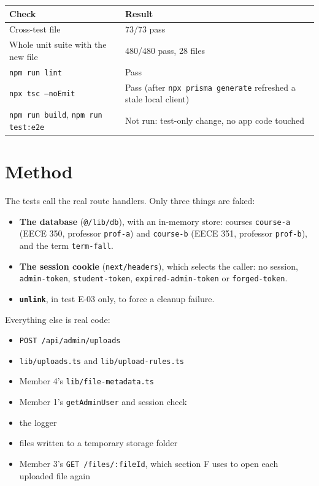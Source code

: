 \documentclass[10pt,a4paper]{article}
\begin{document}
\begin{tabular}{@{}ll@{}}
\toprule \textbf{Check} & \textbf{Result} \\ \midrule
Cross-test file & 73/73 pass \\
Whole unit suite with the new file & 480/480 pass, 28 files \\
\texttt{npm run lint} & Pass \\
\texttt{npx tsc --noEmit} & Pass (after \texttt{npx prisma generate} refreshed a stale local client) \\
\texttt{npm run build}, \texttt{npm run test:e2e} & Not run: test-only change, no app code touched \\
\bottomrule
\end{tabular}

\section*{Method}
The tests call the real route handlers. Only three things are faked:
\begin{itemize}[nosep]
\item \textbf{The database} (\texttt{@/lib/db}), with an in-memory store: courses \texttt{course-a} (EECE 350, professor \texttt{prof-a}) and \texttt{course-b} (EECE 351, professor \texttt{prof-b}), and the term \texttt{term-fall}.
\item \textbf{The session cookie} (\texttt{next/headers}), which selects the caller: no session, \texttt{admin-token}, \texttt{student-token}, \texttt{expired-admin-token} or \texttt{forged-token}.
\item \textbf{\texttt{unlink}}, in test E-03 only, to force a cleanup failure.
\end{itemize}
Everything else is real code:
\begin{itemize}[nosep]
\item \texttt{POST /api/admin/uploads}
\item \texttt{lib/uploads.ts} and \texttt{lib/upload-rules.ts}
\item Member 4's \texttt{lib/file-metadata.ts}
\item Member 1's \texttt{getAdminUser} and session check
\item the logger
\item files written to a temporary storage folder
\item Member 3's \texttt{GET /files/:fileId}, which section F uses to open each uploaded file again
\end{itemize}
\end{document}
